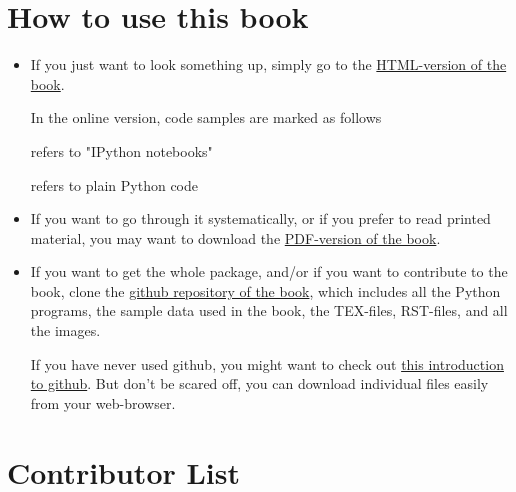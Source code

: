 \section*{How to use this book}

\begin{itemize}
  \item If you just want to look something up, simply go to the \href{http://work.thaslwanter.at/Stats/html} {HTML-version of the book}.

   In the online version, code samples are marked as follows

     refers to "IPython notebooks"

     refers to plain Python code

  \item If you want to go through it systematically, or if you prefer to read
   printed material, you may want to download the \href{http://work.thaslwanter.at/Stats/StatsIntro.pdf} {PDF-version of the book}.

  \item If you want to get the whole package, and/or if you want to
   contribute to the book, clone the  \href{https://github.com/thomas-haslwanter/statsintro} {github repository of the
   book}, which  includes all the Python programs, the sample data used in the book,
   the TEX-files, RST-files, and all the images.

   If you have never used github, you might want to check out \href{https://help.github.com/articles/set-up-git} {this
   introduction to  github}. But don't be  scared off, you can download individual files easily from your
   web-browser.

\end{itemize}


\section*{Contributor List}

